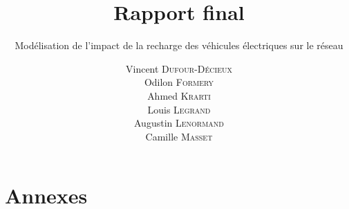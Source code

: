 \documentclass[12pt]{article}
\title{Rapport final}
\subtitle{Modélisation de l'impact de la recharge des véhicules électriques sur le réseau}
\author{ Vincent \textsc{Dufour-Décieux} \\ Odilon \textsc{Formery} \\ Ahmed \textsc{Krarti} \\ Louis \textsc{Legrand} \\ Augustin \textsc{Lenormand} \\ Camille \textsc{Masset} }
\begin{document}
\maketitle

\newpage
\renewcommand{\thepage}{}
\thispagestyle{empty}
\null
\newpage

\renewcommand{\thepage}{\arabic{page}}
\setcounter{page}{1}

\tableofcontents













\pagebreak



\clearpage
\appendix
\section{Annexes}


\end{document}
